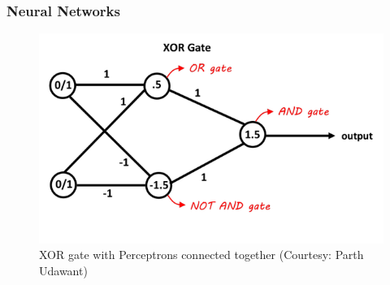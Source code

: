 \documentclass[aspectratio=169]{beamer}
\begin{document}
\begin{frame}
	\frametitle{Neural Networks}
	\begin{center}
		\begin{figure}
			\includegraphics[width=0.7\linewidth,height=0.7\textheight,keepaspectratio]{imgs/xor_nn.png}
			\caption{XOR gate with Perceptrons connected together (Courtesy: Parth Udawant)}
		\end{figure}
	\end{center}
\end{frame}
\end{document}
